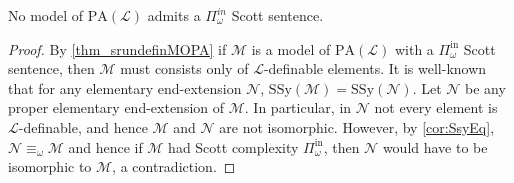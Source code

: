 \documentclass[11pt]{amsart}
\newcommand{\M}{\mathcal{M}}
\newcommand{\N}{\mathcal{N}}
\newcommand{\mc}[1]{\mathcal{#1}}
\newcommand{\Pinf}[1]{\Pi^{\mathrm{in}}_{#1}}
\newcommand{\PA}{\mathrm{PA}}
\newcommand{\SSy}{\mathrm{SSy}}
\def\M{{\mathcal M}}
\def\N{{\mathcal N}}
\theoremstyle{remark}
\begin{document}
\begin{proposition}\label{cor_noPiomega}
	No model of $\mathrm{PA}(\mathcal{L})$ admits a $\Pi_\omega^{in}$ Scott sentence.
\end{proposition}
\begin{proof}
	By \cref{thm_srundefinMOPA} if $\mc{M}$ is a model of $\PA(\mathcal{L})$ with a $\Pinf{\omega}$ Scott sentence, then $\mc{M}$ must consists only of $\mc{L}$-definable elements. It is well-known that for any elementary end-extension $\N$, $\SSy(\M)=\SSy(\N)$. Let $\mc{N}$ be any proper elementary end-extension of $\mc{M}$. In particular, in $\mc{N}$ not every element is $\mc{L}$-definable, and hence $\mc{M}$ and $\mc{N}$ are not isomorphic. However, by \cref{cor:SsyEq}, $\N \equiv_\omega \M$ and hence if $\M$ had Scott complexity $\Pinf{\omega}$, then $\N$ would have to be isomorphic to $\M$, a contradiction.
\end{proof}
\end{document}
